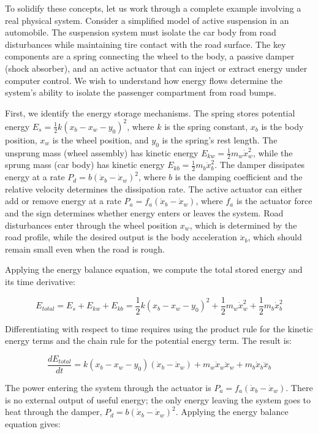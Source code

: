 To solidify these concepts, let us work through a complete example involving a real physical system. Consider a simplified model of active suspension in an automobile. The suspension system must isolate the car body from road disturbances while maintaining tire contact with the road surface. The key components are a spring connecting the wheel to the body, a passive damper (shock absorber), and an active actuator that can inject or extract energy under computer control. We wish to understand how energy flows determine the system's ability to isolate the passenger compartment from road bumps.

First, we identify the energy storage mechanisms. The spring stores potential energy $E_s = \frac{1}{2}k(x_b - x_w - y_0)^2$, where $k$ is the spring constant, $x_b$ is the body position, $x_w$ is the wheel position, and $y_0$ is the spring's rest length. The unsprung mass (wheel assembly) has kinetic energy $E_{kw} = \frac{1}{2}m_w\dot{x}_w^2$, while the sprung mass (car body) has kinetic energy $E_{kb} = \frac{1}{2}m_b\dot{x}_b^2$. The damper dissipates energy at a rate $P_d = b(\dot{x}_b - \dot{x}_w)^2$, where $b$ is the damping coefficient and the relative velocity determines the dissipation rate. The active actuator can either add or remove energy at a rate $P_a = f_a(\dot{x}_b - \dot{x}_w)$, where $f_a$ is the actuator force and the sign determines whether energy enters or leaves the system. Road disturbances enter through the wheel position $x_w$, which is determined by the road profile, while the desired output is the body acceleration $\ddot{x}_b$, which should remain small even when the road is rough.

Applying the energy balance equation, we compute the total stored energy and its time derivative:

$$E_{total} = E_s + E_{kw} + E_{kb} = \frac{1}{2}k(x_b - x_w - y_0)^2 + \frac{1}{2}m_w\dot{x}_w^2 + \frac{1}{2}m_b\dot{x}_b^2$$

Differentiating with respect to time requires using the product rule for the kinetic energy terms and the chain rule for the potential energy term. The result is:

$$\frac{dE_{total}}{dt} = k(x_b - x_w - y_0)(\dot{x}_b - \dot{x}_w) + m_w\dot{x}_w\ddot{x}_w + m_b\dot{x}_b\ddot{x}_b$$

The power entering the system through the actuator is $P_a = f_a(\dot{x}_b - \dot{x}_w)$. There is no external output of useful energy; the only energy leaving the system goes to heat through the damper, $P_d = b(\dot{x}_b - \dot{x}_w)^2$. Applying the energy balance equation gives:

